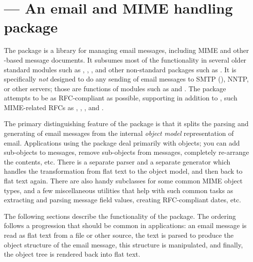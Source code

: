 
\section{ ---
	 An email and MIME handling package}



The  package is a library for managing email messages,
including MIME and other -based message documents.  It
subsumes most of the functionality in several older standard modules
such as , ,
, and other non-standard packages such as
.  It is specifically \emph{not} designed to do any
sending of email messages to SMTP (), NNTP, or other servers; those
are functions of modules such as  and .
The  package attempts to be as RFC-compliant as possible,
supporting in addition to , such MIME-related RFCs as
, , , and .

The primary distinguishing feature of the  package is
that it splits the parsing and generating of email messages from the
internal \emph{object model} representation of email.  Applications
using the  package deal primarily with objects; you can
add sub-objects to messages, remove sub-objects from messages,
completely re-arrange the contents, etc.  There is a separate parser
and a separate generator which handles the transformation from flat
text to the object model, and then back to flat text again.  There
are also handy subclasses for some common MIME object types, and a few
miscellaneous utilities that help with such common tasks as extracting
and parsing message field values, creating RFC-compliant dates, etc.

The following sections describe the functionality of the
 package.  The ordering follows a progression that
should be common in applications: an email message is read as flat
text from a file or other source, the text is parsed to produce the
object structure of the email message, this structure is manipulated,
and finally, the object tree is rendered back into flat text.

